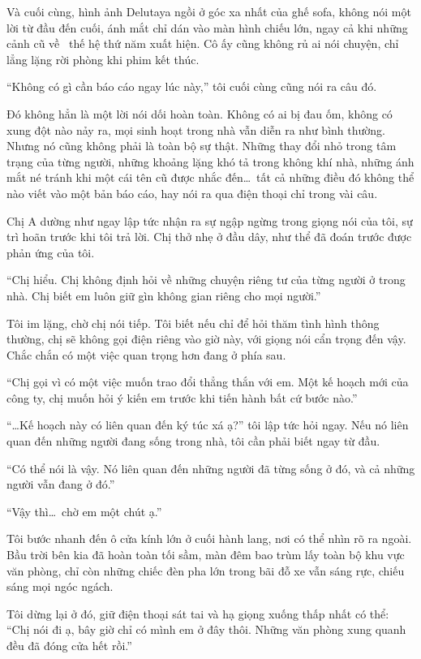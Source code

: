 \documentclass[../main.tex]{subfiles}
\begin{document}
Và cuối cùng, hình ảnh Delutaya ngồi ở góc xa nhất của ghế sofa, không nói một lời từ đầu đến cuối, ánh mắt chỉ dán vào màn hình chiếu lớn, ngay cả khi những cảnh cũ về \hll\ thế hệ thứ năm xuất hiện. Cô ấy cũng không rủ ai nói chuyện, chỉ lẳng lặng rời phòng khi phim kết thúc.

``Không có gì cần báo cáo ngay lúc này,'' tôi cuối cùng cũng nói ra câu đó.

Đó không hẳn là một lời nói dối hoàn toàn. Không có ai bị đau ốm, không có xung đột nào nảy ra, mọi sinh hoạt trong nhà vẫn diễn ra như bình thường. Nhưng nó cũng không phải là toàn bộ sự thật. Những thay đổi nhỏ trong tâm trạng của từng người, những khoảng lặng khó tả trong không khí nhà, những ánh mắt né tránh khi một cái tên cũ được nhắc đến\dots\ tất cả những điều đó không thể nào viết vào một bản báo cáo, hay nói ra qua điện thoại chỉ trong vài câu.

Chị A dường như ngay lập tức nhận ra sự ngập ngừng trong giọng nói của tôi, sự trì hoãn trước khi tôi trả lời. Chị thở nhẹ ở đầu dây, như thể đã đoán trước được phản ứng của tôi.

``Chị hiểu. Chị không định hỏi về những chuyện riêng tư của từng người ở trong nhà. Chị biết em luôn giữ gìn không gian riêng cho mọi người.''

Tôi im lặng, chờ chị nói tiếp. Tôi biết nếu chỉ để hỏi thăm tình hình thông thường, chị sẽ không gọi điện riêng vào giờ này, với giọng nói cẩn trọng đến vậy. Chắc chắn có một việc quan trọng hơn đang ở phía sau.

``Chị gọi vì có một việc muốn trao đổi thẳng thắn với em. Một kế hoạch mới của công ty, chị muốn hỏi ý kiến em trước khi tiến hành bất cứ bước nào.''

``\dots Kế hoạch này có liên quan đến ký túc xá ạ?'' tôi lập tức hỏi ngay. Nếu nó liên quan đến những người đang sống trong nhà, tôi cần phải biết ngay từ đầu.

``Có thể nói là vậy. Nó liên quan đến những người đã từng sống ở đó, và cả những người vẫn đang ở đó.''

``Vậy thì\dots\ chờ em một chút ạ.''

Tôi bước nhanh đến ô cửa kính lớn ở cuối hành lang, nơi có thể nhìn rõ ra ngoài. Bầu trời bên kia đã hoàn toàn tối sầm, màn đêm bao trùm lấy toàn bộ khu vực văn phòng, chỉ còn những chiếc đèn pha lớn trong bãi đỗ xe vẫn sáng rực, chiếu sáng mọi ngóc ngách.

Tôi dừng lại ở đó, giữ điện thoại sát tai và hạ giọng xuống thấp nhất có thể: ``Chị nói đi ạ, bây giờ chỉ có mình em ở đây thôi. Những văn phòng xung quanh đều đã đóng cửa hết rồi.''
\end{document}
